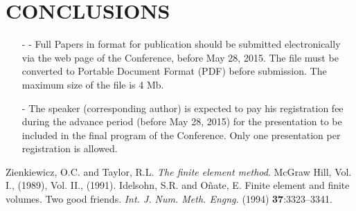 \documentclass{particles2015}
\begin{document}
\section{CONCLUSIONS}

\begin{itemize}
\item[-] -	Full Papers in format for publication should be submitted electronically via the web page of the Conference, before May 28, 2015. The file must be converted to  Portable Document Format (PDF) before submission. The maximum size of the file is 4 Mb.

\item[-] The speaker (corresponding author) is expected to pay his registration fee during the advance period (before May 28, 2015) for the presentation to be included in the final program of the Conference. Only one presentation per registration is allowed.
\end{itemize}

\begin{thebibliography}{99}
  Zienkiewicz, O.C. and  Taylor, R.L. \textit{The finite element method}. McGraw Hill,
Vol. I., (1989), Vol. II., (1991).
 Idelsohn, S.R. and O\~{n}ate, E. Finite element and finite volumes. Two good friends.
\textit{Int. J. Num. Meth. Engng.} (1994) \textbf{37}:3323--3341.
\end{thebibliography}
\end{document}
